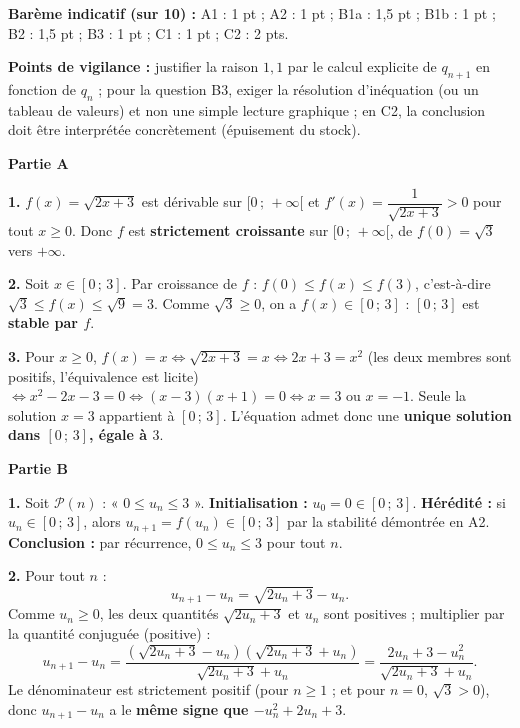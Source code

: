 \documentclass[11pt]{article}
\begin{document}
\begin{corrige}
\textbf{Barème indicatif (sur 10) :} A1 : 1 pt ; A2 : 1 pt ; B1a : 1,5 pt ; B1b : 1 pt ; B2 : 1,5 pt ; B3 : 1 pt ; C1 : 1 pt ; C2 : 2 pts.

\textbf{Points de vigilance :} justifier la raison $1{,}1$ par le calcul explicite de $q_{n+1}$ en fonction de $q_n$ ; pour la question B3, exiger la résolution d'inéquation (ou un tableau de valeurs) et non une simple lecture graphique ; en C2, la conclusion doit être interprétée concrètement (épuisement du stock).
\end{corrige}

\begin{corrige}
\textbf{Partie A}

\textbf{1.} $f(x) = \sqrt{2x+3}$ est dérivable sur $[0\,;\,+\infty[$ et $f'(x) = \dfrac{1}{\sqrt{2x+3}} > 0$ pour tout $x \geq 0$. Donc $f$ est \textbf{strictement croissante} sur $[0\,;\,+\infty[$, de $f(0) = \sqrt{3}$ vers $+\infty$.

\textbf{2.} Soit $x \in [0\,;\,3]$. Par croissance de $f$ : $f(0) \leq f(x) \leq f(3)$, c'est-à-dire $\sqrt{3} \leq f(x) \leq \sqrt{9} = 3$. Comme $\sqrt{3} \geq 0$, on a $f(x) \in [0\,;\,3]$ : $[0\,;\,3]$ est \textbf{stable par $f$}.

\textbf{3.} Pour $x \geq 0$, $f(x) = x \iff \sqrt{2x+3} = x \iff 2x+3 = x^2$ (les deux membres sont positifs, l'équivalence est licite) $\iff x^2 - 2x - 3 = 0 \iff (x-3)(x+1) = 0 \iff x = 3$ ou $x = -1$. Seule la solution $x = 3$ appartient à $[0\,;\,3]$. L'équation admet donc une \textbf{unique solution dans $[0\,;\,3]$, égale à $3$}.

\textbf{Partie B}

\textbf{1.} Soit $\mathcal{P}(n)$ : « $0 \leq u_n \leq 3$ ». \textbf{Initialisation :} $u_0 = 0 \in [0\,;\,3]$. \textbf{Hérédité :} si $u_n \in [0\,;\,3]$, alors $u_{n+1} = f(u_n) \in [0\,;\,3]$ par la stabilité démontrée en A2. \textbf{Conclusion :} par récurrence, $0 \leq u_n \leq 3$ pour tout $n$.

\textbf{2.} Pour tout $n$ :
\[ u_{n+1} - u_n = \sqrt{2u_n + 3} - u_n. \]
Comme $u_n \geq 0$, les deux quantités $\sqrt{2u_n+3}$ et $u_n$ sont positives ; multiplier par la quantité conjuguée (positive) :
\[ u_{n+1} - u_n = \frac{(\sqrt{2u_n+3} - u_n)(\sqrt{2u_n+3} + u_n)}{\sqrt{2u_n+3} + u_n} = \frac{2u_n + 3 - u_n^2}{\sqrt{2u_n+3} + u_n}. \]
Le dénominateur est strictement positif (pour $n \geq 1$ ; et pour $n = 0$, $\sqrt{3} > 0$), donc $u_{n+1} - u_n$ a le \textbf{même signe que $-u_n^2 + 2u_n + 3$}.


\end{corrige}
\end{document}

